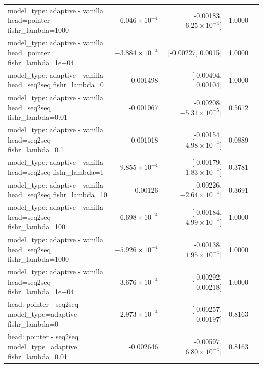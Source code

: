 \documentclass[10pt]{article}
\makeatletter
\newcommand{\stackcell}[1]{\begin{tabular}[t]{@{}l@{}}#1\end{tabular}}
\makeatother
\begin{document}
{\begin{longtable}{lrrrl}
\stackcell{model\_type: adaptive - vanilla\\\footnotesize head=pointer fishr\_lambda=1000 } & $-6.046\times10^{-4}$ & [-0.00183, $6.25\times10^{-4}$] & 1.0000 & \\
\stackcell{model\_type: adaptive - vanilla\\\footnotesize head=pointer fishr\_lambda=1e+04 } & $-3.884\times10^{-4}$ & [-0.00227, 0.0015] & 1.0000 & \\
\stackcell{model\_type: adaptive - vanilla\\\footnotesize head=seq2seq fishr\_lambda=0 } & -0.001498 & [-0.00404, 0.00104] & 1.0000 & \\
\stackcell{model\_type: adaptive - vanilla\\\footnotesize head=seq2seq fishr\_lambda=0.01 } & -0.001067 & [-0.00208, $-5.31\times10^{-5}$] & 0.5612 & \\
\stackcell{model\_type: adaptive - vanilla\\\footnotesize head=seq2seq fishr\_lambda=0.1 } & -0.001018 & [-0.00154, $-4.98\times10^{-4}$] & 0.0889 & \\
\stackcell{model\_type: adaptive - vanilla\\\footnotesize head=seq2seq fishr\_lambda=1 } & $-9.855\times10^{-4}$ & [-0.00179, $-1.83\times10^{-4}$] & 0.3781 & \\
\stackcell{model\_type: adaptive - vanilla\\\footnotesize head=seq2seq fishr\_lambda=10 } & -0.00126 & [-0.00226, $-2.64\times10^{-4}$] & 0.3691 & \\
\stackcell{model\_type: adaptive - vanilla\\\footnotesize head=seq2seq fishr\_lambda=100 } & $-6.698\times10^{-4}$ & [-0.00184, $4.99\times10^{-4}$] & 1.0000 & \\
\stackcell{model\_type: adaptive - vanilla\\\footnotesize head=seq2seq fishr\_lambda=1000 } & $-5.926\times10^{-4}$ & [-0.00138, $1.95\times10^{-4}$] & 1.0000 & \\
\stackcell{model\_type: adaptive - vanilla\\\footnotesize head=seq2seq fishr\_lambda=1e+04 } & $-3.676\times10^{-4}$ & [-0.00292, 0.00218] & 1.0000 & \\
\stackcell{head: pointer - seq2seq\\\footnotesize model\_type=adaptive fishr\_lambda=0 } & $-2.973\times10^{-4}$ & [-0.00257, 0.00197] & 0.8163 & \\
\stackcell{head: pointer - seq2seq\\\footnotesize model\_type=adaptive fishr\_lambda=0.01 } & -0.002646 & [-0.00597, $6.80\times10^{-4}$] & 0.8163 & \\

\end{longtable}}
\end{document}
